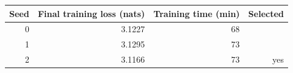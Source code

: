 \begin{tabular}{rrrr}
\toprule
Seed & Final training loss (nats) & Training time (min) & Selected \\
\midrule
0 & 3.1227 & 68 &  \\
1 & 3.1295 & 73 &  \\
2 & 3.1166 & 73 & yes \\
\bottomrule
\end{tabular}
